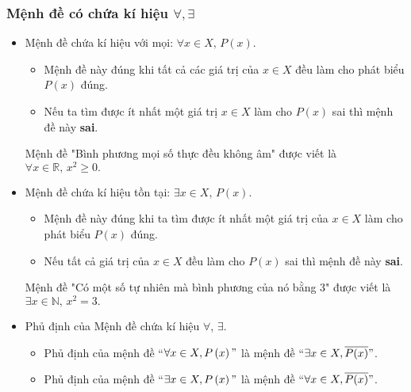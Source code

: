 \subsubsection{Mệnh đề có chứa kí hiệu $\forall, \exists$}
	\begin{itemize}
		\item[\iconMT] Mệnh đề chứa kí hiệu với mọi: $\forall x \in X,\, P(x) $.
	\begin{boxkn}
		\begin{itemize}
			\item Mệnh đề này đúng khi tất cả các giá trị của $x \in X$ đều làm cho phát biểu $P(x)$ đúng.
			\item Nếu ta tìm được ít nhất một giá trị $x \in X$ làm cho $P(x)$ sai thì mệnh đề này \textbf{sai}.
		\end{itemize}
	\end{boxkn}
		\begin{vidu}
			Mệnh đề "Bình phương mọi số thực đều không âm" được viết là
			$\forall x \in \mathbb{R},\, x^2 \ge 0.$
		\end{vidu}
		\item[\iconMT] Mệnh đề chứa kí hiệu tồn tại: $\exists x \in X,\, P(x) $.
	\begin{boxkn}
		\begin{itemize}
			\item Mệnh đề này đúng khi ta tìm được ít nhất một giá trị của $x \in X$ làm cho phát biểu $P(x)$ đúng.
			\item Nếu tất cả giá trị của $x \in X$ đều làm cho $P(x)$ sai thì mệnh đề này \textbf{sai}.
		\end{itemize}
	\end{boxkn}
		\begin{vidu}
			Mệnh đề "Có một số tự nhiên mà bình phương của nó bằng 3" được viết là
			$\exists x \in \mathbb{N},\, x^2=3.$
		\end{vidu}
		\item[\iconMT] Phủ định của Mệnh đề chứa kí hiệu $\forall $, $\exists $.
	\begin{boxkn}
		\begin{itemize}
			\item Phủ định của mệnh đề ``$\forall x\in X,P\left( x \right)"$ là mệnh đề ``$\exists x\in X,\overline{P(x)}"$.
			\item Phủ định của mệnh đề ``$\exists x\in X,P\left( x \right)"$ là mệnh đề ``$\forall x\in X,\overline{P(x)}"$.
		\end{itemize}
	\end{boxkn}
	\end{itemize}

